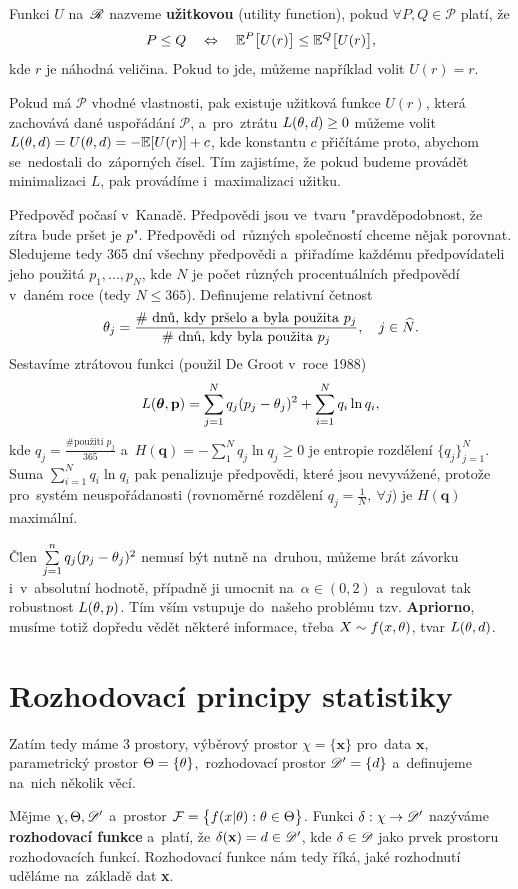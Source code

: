 \begin{define}
	Funkci $U$ na~$\mathscr{R}$ nazveme \textbf{užitkovou} (utility function), pokud $\forall P,Q\in\mathcal{P}$ platí, že 
	$$ P\leq Q\quad\Leftrightarrow\quad\mathbb{E}^P\big[U(r)\big]\leq\mathbb{E}^Q\big[U(r)\big],$$ kde $r$ je náhodná veličina. Pokud to jde, můžeme například volit $U(r)=r$.
\end{define}
\begin{remark}
	Pokud má $\mathcal{P}$ vhodné vlastnosti, pak existuje užitková funkce $U(r)$, která zachovává dané uspořádání $\mathcal{P}$, a~pro~ztrátu $L(\theta,d)\geq 0$ můžeme volit $L(\theta,d)=U(\theta,d)=-\mathbb{E}[U(r)]+c$, kde konstantu $c$ přičítáme proto, abychom se~nedostali do~záporných čísel. Tím zajistíme, že pokud budeme provádět minimalizaci $L$, pak provádíme i~maximalizaci užitku.
\end{remark}
\begin{example}[volba L]
	Předpověď počasí v~Kanadě. Předpovědi jsou ve~tvaru "pravděpodobnost, že zítra bude pršet je $p$". Předpovědi od~různých společností chceme nějak porovnat. Sledujeme tedy 365 dní všechny předpovědi a~přiřadíme každému předpovídateli jeho použitá $p_1,...,p_N$, kde $N$ je počet různých procentuálních předpovědí v~daném roce (tedy $N\leq 365$). Definujeme relativní četnost $$\theta_j=\frac{\text{\# dnů, kdy pršelo a~byla použita }p_j}{\text{\# dnů, kdy byla použita }p_j},\quad j\in\widehat{N}.$$ Sestavíme ztrátovou funkci (použil De Groot v~roce 1988) $$L(\boldsymbol{\theta},\textbf{p})=\sum_{j=1}^N q_j(p_j-\theta_j)^2+\sum_{i=1}^N q_i\ln q_i,$$ kde $q_j=\frac{\text{\# použití }p_j}{365}$ a~$H(\textbf{q})=-\sum_1^N q_j\ln q_j\geq 0$ je entropie rozdělení $\{q_j\}_{j=1}^N$. Suma $\sum_{i=1}^N q_i\ln q_i$ pak penalizuje předpovědi, které jsou nevyvážené, protože pro~systém neuspořádanosti (rovnoměrné rozdělení $q_j=\frac{1}{N},~\forall j$) je $H(\textbf{q})$ maximální.
	
	Člen $\sum\limits_{j=1}^{n} q_j(p_j-\theta_j)^2$ nemusí být nutně na~druhou, můžeme brát závorku i~v~absolutní hodnotě, případně ji umocnit na~$\alpha\in(0,2)$ a~regulovat tak robustnost $L(\theta,p)$. Tím vším vstupuje do~našeho problému tzv. \textbf{Apriorno}, musíme totiž dopředu vědět některé informace, třeba $X\sim f(x,\theta)$, tvar $L(\theta,d)$. 
\end{example}

\chapter{Rozhodovací principy statistiky}

Zatím tedy máme 3 prostory, výběrový prostor $\chi= \{\textbf{x}\}$ pro~data $\textbf{x}$, parametrický prostor $\Theta=\{\theta\}$,~rozhodovací prostor $\mathscr{D}'= \{d\}$ a~definujeme na~nich několik věcí.
\begin{define}
	Mějme $\chi,\Theta,\mathscr{D}'$ a~prostor  $\mathcal{F}=\big\{ f(x|\theta):\theta\in\Theta \big\}$. Funkci $\delta:\chi\to\mathscr{D}' $ nazýváme \textbf{rozhodovací funkce} a~platí, že $\delta(\textbf{x})=d\in\mathscr{D}'$, kde $\delta\in\mathscr{D}$ jako prvek prostoru rozhodovacích funkcí.  Rozhodovací funkce nám tedy říká, jaké rozhodnutí uděláme na~základě dat \textbf{x}.
\end{define}


